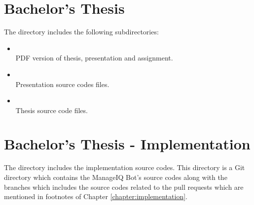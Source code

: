 \section{Bachelor's Thesis}\label{section:BT}

The  directory includes the following subdirectories:

\begin{itemize}

    \item {}\\[0.2em]
        PDF version of thesis, presentation and assignment.

    \item {}\\[0.2em]
        Presentation source codes files.

    \item {}\\[0.2em]
        Thesis source code files.

\end{itemize}

\section{Bachelor's Thesis - Implementation}\label{section:BT-I}

The  directory includes the implementation source codes. This directory is a Git directory which contains the ManageIQ Bot's source codes along with the branches which includes the source codes related to the pull requests which are mentioned in footnotes of Chapter \ref{chapter:implementation}.
